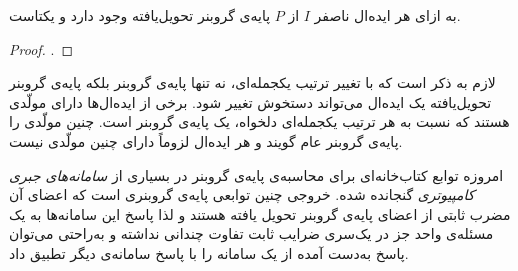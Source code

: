 \begin{theorem}
به ازای هر ایده‌ال ناصفر
$I$
از 
$P$
پایه‌ی گروبنر تحویل‌یافته وجود دارد و یکتاست.
\end{theorem}
\begin{proof}
{\small \cite{IVAcox}}.
%
%
\end{proof}
لازم به ذکر است که با تغییر ترتیب یکجمله‌ای، نه تنها پایه‌ی گروبنر بلکه پایه‌ی گروبنر تحویل‌یافته یک ایده‌ال می‌تواند دستخوش تغییر شود. برخی از ایده‌ال‌ها دارای مولّدی هستند که نسبت به هر ترتیب یکجمله‌ای دلخواه، یک پایه‌ی گروبنر است. چنین مولّدی را پایه‌‌ی گروبنر عام
گویند و هر ایده‌ال لزوماً دارای چنین مولّدی نیست.


امروزه توابع کتاب‌خانه‌ای برای محاسبه‌ی پایه‌ی گروبنر در بسیاری از 
\textit{سامانه‌های جبری کامپیوتری }
گنجانده شده. خروجی چنین توابعی پایه‌ی گروبنری است که اعضای آن مضرب ثابتی از اعضای پایه‌ی گروبنر تحویل یافته هستند و لذا پاسخ این‌ سامانه‌ها به یک مسئله‌ی واحد جز در یک‌سری ضرایب ثابت تفاوت چندانی نداشته و به‌راحتی می‌توان پاسخ به‌دست  آمده از یک سامانه را با پاسخ سامانه‌ی دیگر تطبیق داد.

